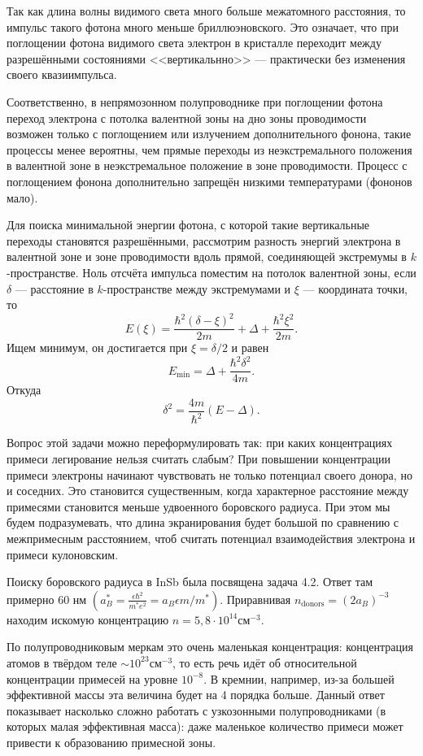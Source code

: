 \documentclass[a4paper]{article}
\begin{document}
\begin{sol}
Так как длина волны видимого света много больше
межатомного расстояния, то импульс такого фотона
много меньше бриллюэновского. Это означает, что
при поглощении фотона видимого света электрон
в кристалле переходит между разрешёнными состояниями
<<вертикальнно>> --- практически без изменения своего
квазиимпульса.

Соответственно, в непрямозонном полупроводнике
при поглощении фотона переход
электрона с потолка валентной зоны на дно зоны
проводимости возможен только с поглощением
или излучением дополнительного фонона, такие
процессы менее вероятны, чем прямые
переходы из неэкстремального положения в валентной
зоне в неэкстремальное положение в зоне проводимости.
Процесс с поглощением фонона дополнительно
запрещён низкими температурами (фононов мало).

Для поиска минимальной энергии фотона, с которой
такие вертикальные переходы становятся
разрешёнными, рассмотрим разность энергий
электрона в валентной зоне и зоне проводимости вдоль
прямой, соединяющей экстремумы в $k$-пространстве.
Ноль отсчёта импульса поместим на потолок валентной
зоны, если $\delta$ --- расстояние в $k$-пространстве
между экстремумами и $\xi$ --- координата точки, то
\[
	E(\xi) = \frac{\hbar ^2 \left( \delta
	-\xi \right) ^2}{2m}+\Delta +\frac{\hbar ^2 \xi^2}{2m}
.\] 
Ищем минимум, он достигается при $\xi =\delta /2$ и
равен 
\[
E_{\min}= \Delta + \frac{\hbar ^2 \delta^2}{4m}
.\] 
Откуда
\[
	\delta^2= \frac{4m}{\hbar ^2} (E-\Delta)
.\] 
\end{sol}
\begin{hiProb}[4.50]
\end{hiProb}
\begin{sol}
Вопрос этой задачи можно переформулировать так:
при каких концентрациях примеси легирование нельзя
считать слабым? При повышении
концентрации примеси электроны начинают 
чувствовать не только потенциал своего донора,
но и соседних. Это становится существенным, когда
характерное расстояние между примесями становится
меньше удвоенного боровского радиуса. При этом
мы будем подразумевать, что длина экранирования
будет большой по сравнению с межпримесным
расстоянием, чтоб считать потенциал взаимодействия
электрона и примеси кулоновским.

Поиску боровского радиуса в InSb была посвящена задача 4.2. Ответ
там примерно 60 нм $\left( a_B^*= \frac{\epsilon 
\hbar ^2}{m^* e^2}=a_B \epsilon  m /m^* \right) $.
Приравнивая $n_\text{donors}= \left( 2a_B \right) ^{-3}$ находим искомую концентрацию $n= 5,8 \cdot 
10^{14}\text{см}^{-3}$.

По полупроводниковым меркам это очень маленькая
концентрация: концентрация атомов в твёрдом
теле $\sim 10^{23} \text{см}^{-3}$, то есть
речь идёт об относительной концентрации примесей
на уровне $10^{-8}$. В кремнии, например, из-за
большей эффективной массы эта величина будет
на 4 порядка больше. Данный ответ показывает
насколько сложно работать с узкозонными полупроводниками
(в которых малая эффективная масса): даже
маленькое количество примеси может привести к
образованию примесной зоны.
\end{sol}
\end{document}
